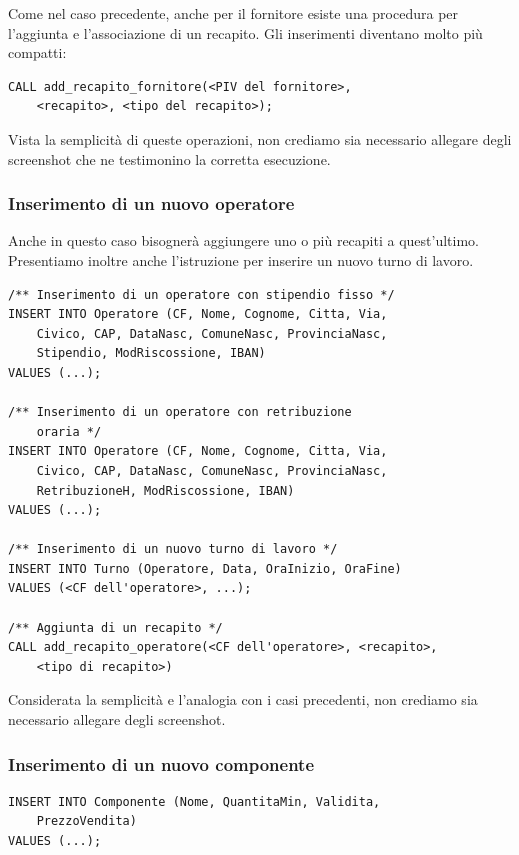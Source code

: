 				Come nel caso precedente, anche per il fornitore esiste una procedura per l'aggiunta e l'associazione di un recapito.
				Gli inserimenti diventano molto più compatti:

				\begin{lstlisting}
CALL add_recapito_fornitore(<PIV del fornitore>,
	<recapito>, <tipo del recapito>);
				\end{lstlisting}

        Vista la semplicità di queste operazioni, non crediamo sia necessario allegare degli screenshot che ne testimonino la corretta esecuzione.


			\subsubsection{Inserimento di un nuovo operatore}
				Anche in questo caso bisognerà aggiungere uno o più recapiti a quest'ultimo. Presentiamo inoltre anche l'istruzione per inserire un nuovo turno di lavoro.
				\begin{lstlisting}
/** Inserimento di un operatore con stipendio fisso */
INSERT INTO Operatore (CF, Nome, Cognome, Citta, Via, 
	Civico, CAP, DataNasc, ComuneNasc, ProvinciaNasc, 
	Stipendio, ModRiscossione, IBAN)
VALUES (...);

/** Inserimento di un operatore con retribuzione
	oraria */
INSERT INTO Operatore (CF, Nome, Cognome, Citta, Via,
	Civico, CAP, DataNasc, ComuneNasc, ProvinciaNasc, 
	RetribuzioneH, ModRiscossione, IBAN)
VALUES (...);

/** Inserimento di un nuovo turno di lavoro */
INSERT INTO Turno (Operatore, Data, OraInizio, OraFine)
VALUES (<CF dell'operatore>, ...);

/** Aggiunta di un recapito */
CALL add_recapito_operatore(<CF dell'operatore>, <recapito>, 
	<tipo di recapito>)
				\end{lstlisting}

        Considerata la semplicità e l'analogia con i casi precedenti, non crediamo sia necessario allegare degli screenshot.


			\subsubsection{Inserimento di un nuovo componente}
				\begin{lstlisting}
INSERT INTO Componente (Nome, QuantitaMin, Validita, 
	PrezzoVendita) 
VALUES (...);
				\end{lstlisting}


